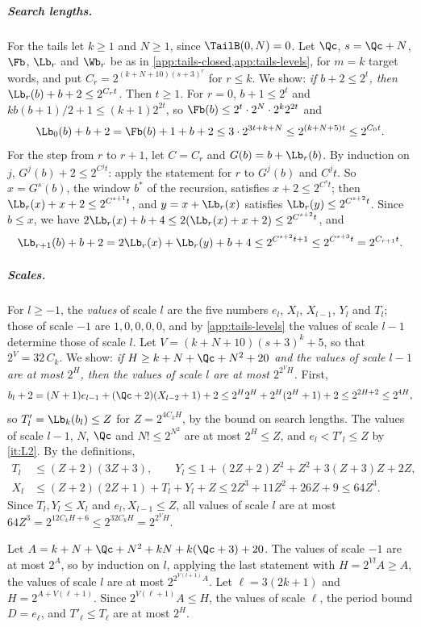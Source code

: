 \subparagraph*{Search lengths.}
For the tails let $k\ge1$ and $N\ge1$, since $\TailB(0,N)=0$. Let $\Qc$,
$s=\Qc+N$, $\Fb$, $\Lb_r$ and $\Wb_r$ be as in
\cref{app:tails-closed,app:tails-levels}, for $m=k$ target words, and put
$C_r=2^{(k+N+10)(s+3)^r}$ for $r\le k$. We show: \emph{if $b+2\le2^t$, then
$\Lb_r(b)+b+2\le2^{C_rt}$.} Then $t\ge1$. For $r=0$, $b+1\le2^t$ and
$kb(b+1)/2+1\le(k+1)2^{2t}$, so $\Fb(b)\le2^t\cdot2^N\cdot2^k2^{2t}$ and
\[
  \Lb_0(b)+b+2=\Fb(b)+1+b+2\le3\cdot2^{3t+k+N}\le2^{(k+N+5)t}\le2^{C_0t}.
\]
For the step from $r$ to $r+1$, let $C=C_r$ and $G(b)=b+\Lb_r(b)$. By
induction on $j$, $G^j(b)+2\le2^{C^jt}$: apply the statement for $r$ to
$G^{j}(b)$ and $C^jt$. So $x=G^s(b)$, the window $b^*$ of the recursion,
satisfies $x+2\le2^{C^st}$; then $\Lb_r(x)+x+2\le2^{C^{s+1}t}$, and
$y=x+\Lb_r(x)$ satisfies $\Lb_r(y)\le2^{C^{s+2}t}$. Since $b\le x$, we have
$2\Lb_r(x)+b+4\le2(\Lb_r(x)+x+2)\le2^{C^{s+2}t}$, and
\[
  \Lb_{r+1}(b)+b+2=2\Lb_r(x)+\Lb_r(y)+b+4\le2^{C^{s+2}t+1}\le
  2^{C^{s+3}t}=2^{C_{r+1}t}.
\]

\subparagraph*{Scales.}
For $l\ge-1$, the \emph{values} of scale $l$ are the five numbers $e_l$,
$X_l$, $X_{l-1}$, $Y_l$ and $T_l$; those of scale $-1$ are $1,0,0,0,0$, and
by \cref{app:tails-levels} the values of scale $l-1$ determine those of
scale $l$. Let $V=(k+N+10)(s+3)^k+5$, so that $2^V=32\,C_k$. We show:
\emph{if $H\ge k+N+\Qc+N^2+20$ and the values of scale $l-1$ are at most
$2^H$, then the values of scale $l$ are at most $2^{2^VH}$.} First,
\[
  b_l+2=(N+1)e_{l-1}+(\Qc+2)(X_{l-2}+1)+2\le2^H2^H+2^H(2^H+1)+2\le2^{2H+2}
  \le2^{4H},
\]
so $T'_l=\Lb_k(b_l)\le Z$ for $Z=2^{4C_kH}$, by the bound on search
lengths. The values of scale $l-1$, $N$, $\Qc$ and $N!\le2^{N^2}$ are at most
$2^H\le Z$, and $e_l<T'_l\le Z$ by \ref{it:L2}. By the definitions,
\begin{align*}
  T_l&\le(Z+2)(3Z+3), \qquad
  Y_l\le1+(2Z+2)Z^2+Z^2+3(Z+3)Z+2Z,\\
  X_l&\le(Z+2)(2Z+1)+T_l+Y_l+Z\le2Z^3+11Z^2+26Z+9\le64Z^3 .
\end{align*}
Since $T_l,Y_l\le X_l$ and $e_l,X_{l-1}\le Z$, all values of scale $l$ are at
most $64Z^3=2^{12C_kH+6}\le2^{32C_kH}=2^{2^VH}$.

Let $A=k+N+\Qc+N^2+kN+k(\Qc+3)+20$. The values of scale $-1$ are at most $2^A$,
so by induction on $l$, applying the last statement with $H=2^{Vl}A\ge A$,
the values of scale $l$ are at most $2^{2^{V(l+1)}A}$. Let $\ell=3(2k+1)$
and $H=2^{A+V(\ell+1)}$. Since $2^{V(\ell+1)}A\le H$, the values of scale
$\ell$, the period bound $D=e_\ell$, and $T'_\ell\le T_\ell$ are at most
$2^H$.

